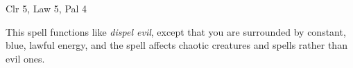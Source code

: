 
\begin{description*}
\item[Level:] Clr 5, Law 5, Pal 4
\end{description*}

This spell functions like \textit{dispel evil}, except that you are surrounded
by constant, blue, lawful energy, and the spell affects chaotic creatures and spells
rather than evil ones.